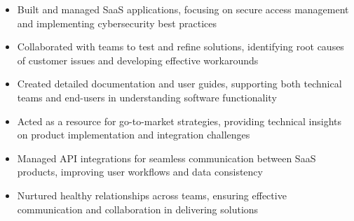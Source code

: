 \par\smallskip
\noindent
\begin{minipage}{20cm}
  \begin{minipage}{9.75cm}
    \begin{itemize}
      \item Built and managed SaaS applications, focusing on secure access management and implementing cybersecurity best practices
      \item Collaborated with teams to test and refine solutions, identifying root causes of customer issues and developing effective workarounds
      \item Created detailed documentation and user guides, supporting both technical teams and end-users in understanding software functionality
    \end{itemize}
  \end{minipage}
  \hfill
  \begin{minipage}{9.75cm}
    \begin{itemize}
      \item Acted as a resource for go-to-market strategies, providing technical insights on product implementation and integration challenges
      \item Managed API integrations for seamless communication between SaaS products, improving user workflows and data consistency
      \item Nurtured healthy relationships across teams, ensuring effective communication and collaboration in delivering solutions
    \end{itemize}
  \end{minipage}
\end{minipage}
\par\smallskip
\divider


